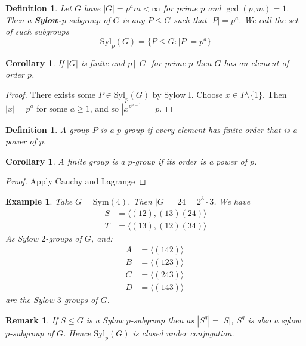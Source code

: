 \documentclass[a4paper,10pt]{article}
\newtheorem{Def}[thm]{Definition}
\newtheorem{Cor}[thm]{Corollary}
\newtheorem{eg}[thm]{Example}
\newtheorem{rem}[thm]{Remark}
\begin{document}
\begin{Def}
Let $G$ have $|G| = p^a m < \infty$ for prime $p$ and $\gcd(p,m) = 1$. Then a \textbf{Sylow-$p$} subgroup of $G$ is any $P \leq G$ such that $|P| = p^a$. We call the set of such subgroups
\[ \text{Syl}_p(G) = \{ P \leq G : |P| = p^a \} \]
\end{Def}


\begin{Cor}
If $|G|$ is finite and $p \, \big| \, |G|$ for prime $p$ then $G$ has an element of order $p$. 
\end{Cor}

\begin{proof}
There exists some $P \in \text{Syl}_p(G)$ by Sylow I. Choose $x \in P \setminus \{ 1 \}$. Then $|x| = p^a$ for some $a \geq 1$, and so $|x^{p^{a-1}}| = p$. 
\end{proof}

\begin{Def}
A group $P$ is a $p$-group if every element has finite order that is a power of $p$.
\end{Def}

\begin{Cor}
A finite group is a $p$-group if its order is a power of $p$. 
\end{Cor}
\begin{proof}
Apply Cauchy and Lagrange
\end{proof}

\begin{eg}
Take $G = \text{Sym}(4)$. Then $|G| = 24 = 2^3 \cdot 3$. We have 
\begin{align*}
S &= \langle (12), (13)(24) \rangle \\
T &= \langle (13), (12)(34) \rangle 
\end{align*}
As Sylow $2$-groups of $G$, and:
\begin{align*}
A &= \langle (142) \rangle \\
B &= \langle (123) \rangle \\
C &= \langle (243) \rangle \\
D &= \langle (143) \rangle\
\end{align*}
are the Sylow $3$-groups of $G$. 
\end{eg}

\begin{rem}
If $S \leq G$ is a Sylow $p$-subgroup then as $|S^g| = |S|$, $S^g$ is also a sylow $p$-subgroup of $G$. Hence $\text{Syl}_p(G)$ is closed under conjugation. 
\end{rem}
\end{document}
